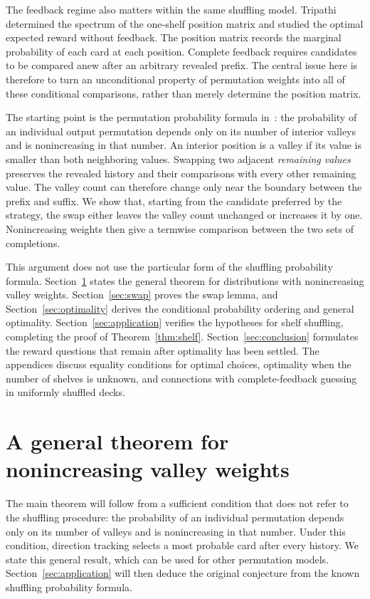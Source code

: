 \documentclass[10pt,a4paper]{amsart}
\numberwithin{equation}{section}
\begin{document}
The feedback regime also matters within the same shuffling model. Tripathi~\cite{TripathiPosition} determined the spectrum of the one-shelf position matrix and studied the optimal expected reward without feedback. The position matrix records the marginal probability of each card at each position. Complete feedback requires candidates to be compared anew after an arbitrary revealed prefix. The central issue here is therefore to turn an unconditional property of permutation weights into all of these conditional comparisons, rather than merely determine the position matrix.

The starting point is the permutation probability formula in~\cite[Theorem 3.1 and Corollary 3.3]{DFH}: the probability of an individual output permutation depends only on its number of interior valleys and is nonincreasing in that number. An interior position is a valley if its value is smaller than both neighboring values. Swapping two adjacent \emph{remaining values} preserves the revealed history and their comparisons with every other remaining value. The valley count can therefore change only near the boundary between the prefix and suffix. We show that, starting from the candidate preferred by the strategy, the swap either leaves the valley count unchanged or increases it by one. Nonincreasing weights then give a termwise comparison between the two sets of completions.

This argument does not use the particular form of the shuffling probability formula. Section~\ref{sec:valleys} states the general theorem for distributions with nonincreasing valley weights. Section~\ref{sec:swap} proves the swap lemma, and Section~\ref{sec:optimality} derives the conditional probability ordering and general optimality. Section~\ref{sec:application} verifies the hypotheses for shelf shuffling, completing the proof of Theorem~\ref{thm:shelf}. Section~\ref{sec:conclusion} formulates the reward questions that remain after optimality has been settled. The appendices discuss equality conditions for optimal choices, optimality when the number of shelves is unknown, and connections with complete-feedback guessing in uniformly shuffled decks.
\section{A general theorem for nonincreasing valley weights}\label{sec:valleys}
The main theorem will follow from a sufficient condition that does not refer to the shuffling procedure: the probability of an individual permutation depends only on its number of valleys and is nonincreasing in that number. Under this condition, direction tracking selects a most probable card after every history. We state this general result, which can be used for other permutation models. Section~\ref{sec:application} will then deduce the original conjecture from the known shuffling probability formula.
\end{document}
